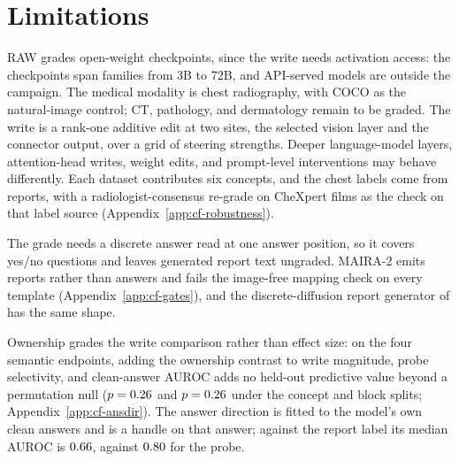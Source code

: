 \section*{Limitations}
\label{sec:limitations}
RAW grades open-weight checkpoints, since the write needs activation access: the \cfCheckpoints{} checkpoints span \cfFamiliesWord{} families from 3B to 72B, and API-served models are outside the campaign. The medical modality is chest radiography, with COCO as the natural-image control; CT, pathology, and dermatology remain to be graded. The write is a rank-one additive edit at two sites, the selected vision layer and the connector output, over a grid of steering strengths. Deeper language-model layers, attention-head writes, weight edits, and prompt-level interventions may behave differently. Each dataset contributes six concepts, and the chest labels come from reports, with a radiologist-consensus re-grade on \cfValidRows{} CheXpert films as the check on that label source (Appendix~\ref{app:cf-robustness}).

The grade needs a discrete answer read at one answer position, so it covers yes/no questions and leaves generated report text ungraded. MAIRA-2 \citep{bannur2024maira} emits reports rather than answers and fails the image-free mapping check on every template (Appendix~\ref{app:cf-gates}), and the discrete-diffusion report generator of \citet{chen2026echo} has the same shape.

Ownership grades the write comparison rather than effect size: on the four semantic endpoints, adding the ownership contrast to write magnitude, probe selectivity, and clean-answer AUROC adds no held-out predictive value beyond a permutation null ($p=0.26$ and $p=0.26$ under the concept and block splits; Appendix~\ref{app:cf-ansdir}). The answer direction is fitted to the model's own clean answers and is a handle on that answer; against the report label its median AUROC is $0.66$, against $0.80$ for the probe.
